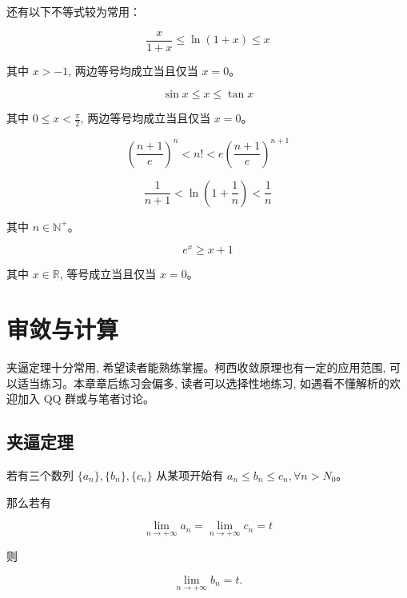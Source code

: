 \documentclass[lang=cn,10pt,twoside]{elegantbook}
\begin{document}
还有以下不等式较为常用：
\begin{proposition}
  \begin{equation*}
    \frac{x}{1+x} \leq \ln(1+x) \leq x
  \end{equation*}

  其中 $x > -1$, 两边等号均成立当且仅当 $x=0$。
\end{proposition}
\begin{proposition}
  \begin{equation*}
    \sin x \leq x \leq \tan x
  \end{equation*}

  其中 $0 \leq x < \frac{\pi}2$, 两边等号均成立当且仅当 $x=0$。
\end{proposition}
\begin{proposition}
  $$\left(\frac{n+1}{e}\right)^n < n! < e\left(\frac{n+1}e\right)^{n+1}$$
\end{proposition}
\begin{proposition}
  $$\frac{1}{n+1} < \ln\left(1+\frac1n\right) < \frac 1n$$

  其中 $n \in \mathbb N^+$。
\end{proposition}
\begin{proposition}
  \begin{equation*}
    e^x \geq x+1
  \end{equation*}

  其中 $x \in \mathbb R$, 等号成立当且仅当 $x=0$。
\end{proposition}

\section{审敛与计算}

夹逼定理十分常用, 希望读者能熟练掌握。柯西收敛原理也有一定的应用范围, 可以适当练习。本章章后练习会偏多, 读者可以选择性地练习, 如遇看不懂解析的欢迎加入 QQ 群或与笔者讨论。

\subsection{夹逼定理}
\begin{theorem}[夹逼定理]
  若有三个数列 $\{a_n\}, \{b_n\}, \{c_n\}$ 从某项开始有 $a_n \leq b_n \leq c_n, \forall n > N_0$。
  
  那么若有

  $$\lim_{n \rightarrow +\infty} a_n = \lim_{n \rightarrow +\infty} c_n = t$$

  则

  $$\lim_{n \rightarrow +\infty} b_n = t.$$
\end{theorem}
\end{document}
